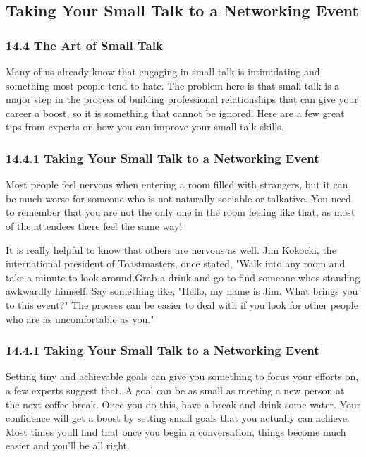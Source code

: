 \documentclass[aspectratio=169,UTF8,c]{beamer}%
\begin{document}
\subsection{Taking Your Small Talk to a Networking Event}
\begin{frame}
	\frametitle{14.4 The Art of Small Talk}
	Many of us already know that engaging in small talk is intimidating and something most people tend to hate. The problem here is that small talk is a major step in the process of building professional relationships that can give your career a boost, so it is something that cannot be ignored. Here are a few great tips from experts on how you can improve your small talk skills.
\end{frame}
\begin{frame}
	\frametitle{14.4.1 Taking Your Small Talk to a Networking Event}
	Most people feel nervous when entering a room filled with strangers, but it can be much worse for someone who is not naturally sociable or talkative. You need to remember that you are not the only one in the room feeling like that, as most of the attendees there feel the same way!
	
	It is really helpful to know that others are nervous as well. Jim Kokocki, the international president of Toastmasters, once stated, "Walk into any room and take a minute to look around.Grab a drink and go to find someone whos standing awkwardly himself. Say something like, "Hello, my name is Jim. What brings you to this event?" The process can be easier to deal with if you look for other people who are as uncomfortable as you."
\end{frame}
\begin{frame}
	\frametitle{14.4.1 Taking Your Small Talk to a Networking Event}
	Setting tiny and achievable goals can give you something to focus your efforts on, a few experts suggest that. A goal can be as small as meeting a new person at the next coffee break. Once you do this, have a break and drink some water. Your confidence will get a boost by setting small goals that you actually can achieve. Most times youll find that once you begin a conversation, things become much easier and you'll be all right.
\end{frame}
\end{document}
